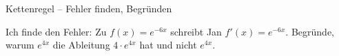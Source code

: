 \begin{aufgabe}{Kettenregel – Fehler finden, Begründen}
\begin{teile}
\teil Ich finde den Fehler: Zu $f(x) = e^{-6x}$ schreibt Jan $f'(x) = e^{-6x}$.
\teil Begründe, warum $e^{4x}$ die Ableitung $4 \cdot e^{4x}$ hat und nicht $e^{4x}$.
\end{teile}
\end{aufgabe}
